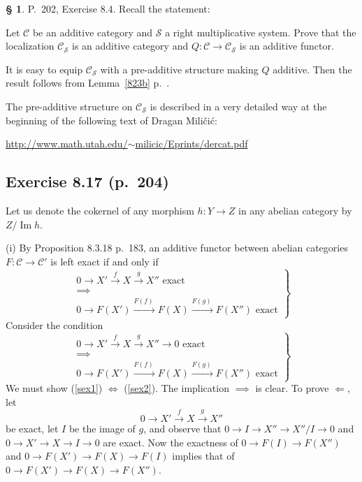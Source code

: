 \documentclass[12pt]{article}
\theoremstyle{remark}
\theoremstyle{definition}
\newtheorem{s}[thm]{\S}
\newcommand{\cc}{\mathcal}
\newcommand{\C}{\mathcal C}
\DeclareMathOperator{\Ima}{Im}
\begin{document}
%
%
\begin{s} 
P.~202, Exercise 8.4. Recall the statement: 

Let $\C$ be an additive category and $\cc S$ a right multiplicative system. Prove that the localization $\C_{\cc S}$ is an additive category and $Q:\C\to\C_{\cc S}$ is an additive functor. 

It is easy to equip $\C_{\cc S}$ with a pre-additive structure making $Q$ additive. Then the result follows from Lemma~\ref{823b} p.~\pageref{823b}. 

The pre-additive structure on $\C_{\cc S}$ is described in a very detailed way at the beginning of the following text of Dragan Mili\v{c}i\'c:%
%
\begin{center}\href{http://www.math.utah.edu/~milicic/Eprints/dercat.pdf}{http://www.math.utah.edu/$\sim$milicic/Eprints/dercat.pdf}
\end{center}
\end{s}
%
%
\subsection{Exercise 8.17 (p.~204)}\label{817} 
%
Let us denote the cokernel of any morphism $h:Y\to Z$ in any abelian category by $Z/\Ima h$. 

(i) By Proposition 8.3.18 p.~183, an additive functor between abelian categories $F:\C\to\C'$ is left exact if and only if 
\begin{equation}\label{sex1}
\left.
\begin{matrix}
0\to X'\overset{f}{\to}X\overset{g}{\to}X''\text{ exact }\\ 
\implies\\ 
0\to F(X')\overset{F(f)\ }{\longrightarrow}F(X)\overset{F(g)\ }{\longrightarrow}F(X'')\text{ exact}
\end{matrix}
\right\}
\end{equation} 
Consider the condition 
\begin{equation}\label{sex2}
\left.
\begin{matrix}
0\to X'\overset{f}{\to}X\overset{g}{\to}X''\to0\text{ exact }\\ 
\implies\\ 
0\to F(X')\overset{F(f)\ }{\longrightarrow}F(X)\overset{F(g)\ }{\longrightarrow}F(X'')\text{ exact}
\end{matrix}
\right\}
\end{equation}
We must show (\ref{sex1}) $\iff$ (\ref{sex2}). The implication $\implies$ is clear. To prove $\Longleftarrow$, let 
$$
0\to X'\overset{f}{\to}X\overset{g}{\to}X''
$$
be exact, let $I$ be the image of $g$, and observe that $0\to I\to X''\to X''/I\to0$ and $0\to X'\to X\to I\to0$ are exact. Now the exactness of $0\to F(I)\to F(X'')$ and $0\to F(X')\to F(X)\to F(I)$ implies that of $0\to F(X')\to F(X)\to F(X'')$. 
\end{document}
